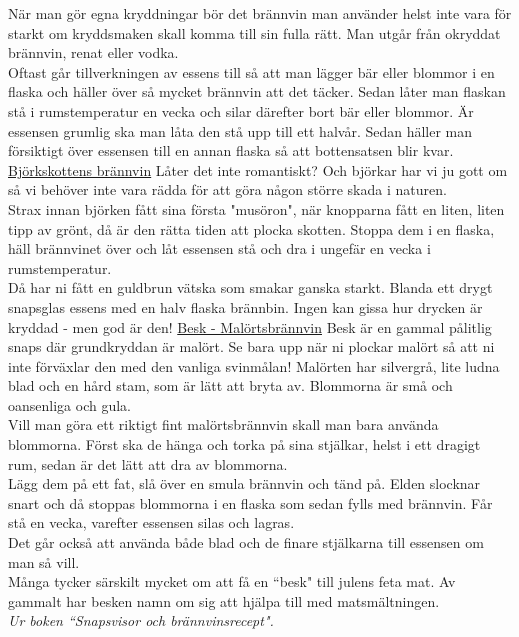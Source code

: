 \vspace{10pt}
\hspace{10pt}När man gör egna kryddningar bör det brännvin 
man använder helst inte vara för starkt om kryddsmaken 
skall komma till sin fulla rätt. Man utgår från okryddat 
brännvin, renat eller vodka.\\
\indent Oftast går tillverkningen av essens till så att man 
lägger bär eller blommor i en flaska och häller över så 
mycket brännvin att det täcker. Sedan låter man flaskan 
stå i rumstemperatur en vecka och silar därefter bort bär 
eller blommor. Är essensen grumlig ska man låta den stå 
upp till ett halvår. Sedan häller man försiktigt över 
essensen till en annan flaska så att bottensatsen blir kvar.
\vspace{10pt}
\underline{Björkskottens brännvin}
\vspace{10pt}
\indent Låter det inte romantiskt? Och björkar har vi ju gott 
om så vi behöver inte vara rädda för att göra någon större 
skada i naturen.\\
\indent Strax innan björken fått sina första "musöron", när 
knopparna fått en liten, liten tipp av grönt, då är den rätta 
tiden att plocka skotten. Stoppa dem i en flaska, häll 
brännvinet över och låt essensen stå och dra i ungefär en 
vecka i rumstemperatur.\\
\indent Då har ni fått en guldbrun vätska som smakar 
ganska starkt. Blanda ett drygt snapsglas essens med en 
halv flaska brännbin. Ingen kan gissa hur drycken är 
kryddad - men god är den!
\vspace{10pt}
\underline{Besk - Malörtsbrännvin}
\vspace{10pt}
\indent Besk är en gammal pålitlig snaps där grundkryddan 
är malört. Se bara upp när ni plockar malört så att ni inte 
förväxlar den med den vanliga svinmålan! Malörten har 
silvergrå, lite ludna blad och en hård stam, som är lätt att 
bryta av. Blommorna är små och oansenliga och gula.\\
\indent Vill man göra ett riktigt fint malörtsbrännvin skall 
man bara använda blommorna. Först ska de hänga och 
torka på sina stjälkar, helst i ett dragigt rum, sedan är det 
lätt att dra av blommorna.\\
\indent Lägg dem på ett fat, slå över en smula brännvin och 
tänd på. Elden slocknar snart och då stoppas blommorna i 
en flaska som sedan fylls med brännvin. Får stå en vecka, 
varefter essensen silas och lagras.\\
\indent Det går också att använda både blad och de finare 
stjälkarna till essensen om man så vill.\\
\indent Många tycker särskilt mycket om att få en ``besk" 
till julens feta mat. Av gammalt har besken namn om sig 
att hjälpa till med matsmältningen.\\
\vspace{10pt}
{\footnotesize\textit{Ur boken ``Snapsvisor och brännvinsrecept".}}
